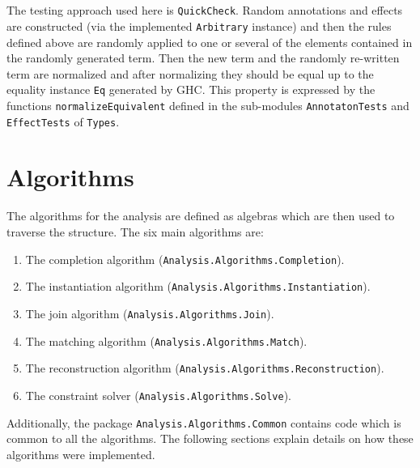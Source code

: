 \documentclass[8pt]{extarticle}
\begin{document}
\\\\ 
The testing approach used here is \verb+QuickCheck+. Random annotations and effects are constructed (via the implemented \verb+Arbitrary+ instance) and then the rules defined above are randomly applied to one or several of the elements contained in the randomly generated term. Then the new term and the randomly re-written term are normalized and after normalizing they should be equal up to the equality instance \verb+Eq+ generated by GHC. This property is expressed by the functions \verb+normalizeEquivalent+ defined in the sub-modules \verb+AnnotatonTests+ and \verb+EffectTests+ of \verb+Types+.
\section{Algorithms}
The algorithms for the analysis are defined as algebras which are then used to traverse the structure. The six main algorithms are:
\begin{enumerate}
\item The completion algorithm (\verb+Analysis.Algorithms.Completion+).
\item The instantiation algorithm (\verb+Analysis.Algorithms.Instantiation+).
\item The join algorithm (\verb+Analysis.Algorithms.Join+).
\item The matching algorithm (\verb+Analysis.Algorithms.Match+).
\item The reconstruction algorithm (\verb+Analysis.Algorithms.Reconstruction+).
\item The constraint solver (\verb+Analysis.Algorithms.Solve+).
\end{enumerate}
Additionally, the package \verb+Analysis.Algorithms.Common+ contains code which is common to all the algorithms. The following sections explain details on how these algorithms were implemented.
\end{document}

